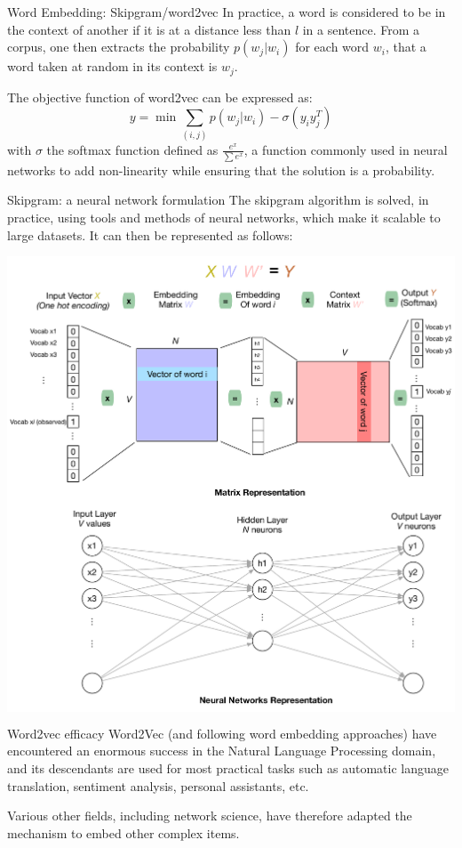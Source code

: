 \documentclass[a4paper,11pt]{book}
\begin{document}
\begin{textbox}{Word Embedding: Skipgram/word2vec}
In practice, a word is considered to be in the context of another if it is at a distance less than $l$ in a sentence. From a corpus, one then extracts the probability $p(w_j|w_i)$ for each word $w_i$, that a word taken at random in its context is $w_j$.

The objective function of word2vec can be expressed as:
\[
y=\min \sum_{(i,j)} p(w_j|w_i)-\sigma(y_i y_j^T)
\]
with $\sigma$ the softmax function defined as $\frac{e^x}{\sum e^x}$, a function commonly used in neural networks to add non-linearity while ensuring that the solution is a probability.
\end{textbox}


\begin{textbox}{Skipgram: a neural network formulation}
The skipgram algorithm is solved, in practice, using tools and methods of neural networks, which make it scalable to large datasets. It can then be represented as follows:

\centering

\colorbox{white}{\includegraphics[width=0.8\linewidth]{pics/skipgram.pdf}}
\end{textbox}


\begin{textbox}{Word2vec efficacy}
Word2Vec (and following word embedding approaches) have encountered an enormous success in the Natural Language Processing domain, and its descendants are used for most practical tasks such as automatic language translation, sentiment analysis, personal assistants, etc.

Various other fields, including network science, have therefore adapted the mechanism to embed other complex items.
\end{textbox}
\end{document}
